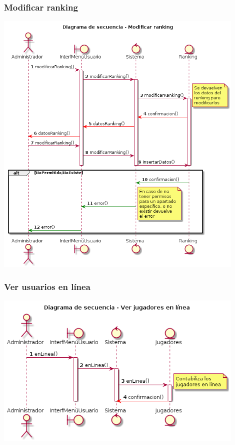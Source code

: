 \subsubsection{Modificar ranking}
\begin{center}
  \includegraphics[width=0.9\textwidth]{./imatges/administrador/Modificar_ranking.png}
  \end{center}
  
\subsubsection{Ver usuarios en línea}
\begin{center}
  \includegraphics[width=0.9\textwidth]{./imatges/administrador/Ver_usuarios_en_linea.png}
  \end{center}



